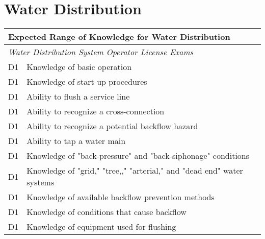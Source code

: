 
\chapter{Water Distribution}

\begin{table}[H]
\begin{tabular}{| m{1cm} | m{15cm} |}
\hline
\multicolumn{2}{|l|}{\textbf{Expected   Range of Knowledge for Water Distribution}}                                                                          \\ \hline
\multicolumn{2}{|l|}{\textit{Water   Distribution System Operator License Exams}}                                                                                      \\ \hline
D1 & Knowledge of   basic operation                                                                                 \\ \hline
D1 & Knowledge of start-up   procedures                                                                             \\ \hline
D1 & Ability to flush a   service line                                                                              \\ \hline
D1 & Ability to recognize   a cross-connection                                                                      \\ \hline
D1 & Ability to recognize   a potential backflow hazard                                                             \\ \hline
D1 & Ability to tap a   water main                                                                                  \\ \hline
D1 & Knowledge of   "back-pressure" and "back-siphonage" conditions                                                 \\ \hline
D1 & Knowledge of   "grid," "tree,," "arterial," and "dead   end" water systems                                     \\ \hline
D1 & Knowledge of   available backflow prevention methods                                                           \\ \hline
D1 & Knowledge of   conditions that cause backflow                                                                  \\ \hline
D1 & Knowledge of   equipment used for flushing                                                                     \\ \hline

\end{tabular}
\end{table}
